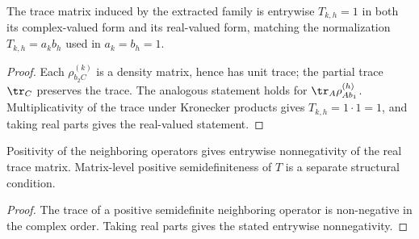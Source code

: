 \begin{theorem}
    \label{thm:mpdo_eta_of_hayashi_markov_trace_matrix}
    \leanok
    The trace matrix induced by the extracted family is entrywise
    $T_{k,h} = 1$ in both its complex-valued form and its real-valued form,
    matching the normalization $T_{k,h} = a_k b_h$ used in
    $a_k = b_h = 1$.
\end{theorem}

\begin{proof}
    \leanok
    Each $\rho_{b_2 C}^{(k)}$ is a density matrix, hence has unit trace; the
    partial trace $\tr_C$ preserves the trace. The analogous statement holds
    for $\tr_A \rho_{A b_1}^{(h)}$. Multiplicativity of the trace under
    Kronecker products gives $T_{k,h} = 1 \cdot 1 = 1$, and taking real parts
    gives the real-valued statement.
\end{proof}

\begin{theorem}
    \label{thm:mpdo_explicit_eta_trace_matrix_nonneg}
    \leanok
    Positivity of the neighboring operators gives entrywise nonnegativity of
    the real trace matrix. Matrix-level positive semidefiniteness of $T$ is a
    separate structural condition.
\end{theorem}

\begin{proof}
    \leanok
    The trace of a positive semidefinite neighboring operator is non-negative in
    the complex order. Taking real parts gives the stated entrywise
    nonnegativity.
\end{proof}

